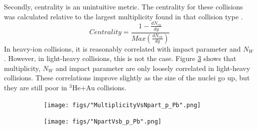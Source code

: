 \documentclass[preprint,showpacs,amsfonts,aps,prl,nofootinbib,floatfix]{revtex4}
\begin{document}
Secondly, centrality is an unintuitive metric. The centrality for these collisions was calculated relative to the largest multiplicity found in that collision type \cite{Shen:2014vra}.
\begin{equation}
Centrality = \frac{1-\frac{dN_{ch}}{dy}}{Max(\frac{dN_{ch}}{dy})} 
\end{equation}
In heavy-ion collisions, it is reasonably correlated with impact parameter and $N_W$. However, in light-heavy collisions, this is not the case. Figure \ref{fig:MutliplcityNpartB} shows that multiplicity, $N_W$ and impact parameter are only loosely correlated in light-heavy collisions. These correlations improve slightly as the size of the nuclei go up, but they are still poor in $^3$He+Au collisions.
\begin{figure}
	\begin{subfigure}{0.4\linewidth}
		\texttt{[image: figs/"MultiplicityVsNpart\_p\_Pb".png]}
		\subcaption{}
		\label{subfig:MultVsNpart}
	\end{subfigure}
	\begin{subfigure}{0.4\linewidth}
		\texttt{[image: figs/"NpartVsb\_p\_Pb".png]}
		\subcaption{}
		\label{subfig:NpartVsb}
	\end{subfigure}
	
	\caption{}
	\label{fig:MutliplcityNpartB}
\end{figure}
\end{document}

